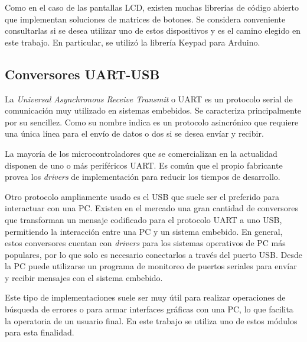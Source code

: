 Como en el caso de las pantallas LCD, existen muchas librerías de código abierto que implementan soluciones de matrices de botones. Se considera conveniente consultarlas si se desea utilizar uno de estos dispositivos y es el camino elegido en este trabajo. En particular, se utilizó la librería Keypad para Arduino\citep{web_repo_keypad}.

\subsection{Conversores UART-USB}
\label{conversor_usb}
La \textit{Universal Asynchronous Receive Transmit} o UART es un protocolo serial de comunicación muy utilizado en sistemas embebidos. Se caracteriza principalmente por su sencillez. Como su nombre indica es un protocolo asincrónico que requiere una única línea para el envío de datos o dos si se desea envíar y recibir.

La mayoría de los microcontroladores que se comercializan en la actualidad disponen de uno o más periféricos UART. Es común que el propio fabricante provea los \textit{drivers} de implementación para reducir los tiempos de desarrollo.

Otro protocolo ampliamente usado es el USB que suele ser el preferido para interactuar con una PC. Existen en el mercado una gran cantidad de conversores que transforman un mensaje codificado para el protocolo UART a uno USB, permitiendo la interacción entre una PC y un sistema embebido. En general, estos conversores cuentan con \textit{drivers} para los sistemas operativos de PC más populares, por lo que solo es necesario conectarlos a través del puerto USB. Desde la PC puede utilizarse un programa de monitoreo de puertos seriales para envíar y recibir mensajes con el sistema embebido.

Este tipo de implementaciones suele ser muy útil para realizar operaciones de búsqueda de errores o para armar interfaces gráficas con una PC, lo que facilita la operatoria de un usuario final. En este trabajo se utiliza uno de estos módulos para esta finalidad.
